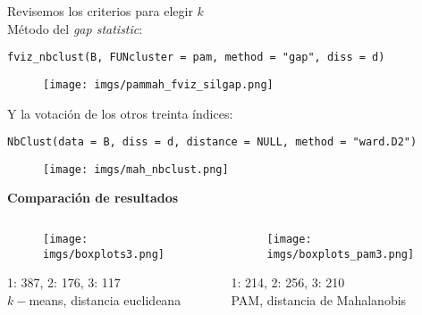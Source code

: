 \documentclass[10pt, aspectratio=169]{beamer}
\begin{document}
{
\begin{frame}[fragile]{}
\vspace{0.3cm}
Revisemos los criterios para elegir $k$\\
\vspace{0.3cm}
\textcolor{UltraViolet}{Método del \textit{gap statistic}:}
\begin{verbatim}
fviz_nbclust(B, FUNcluster = pam, method = "gap", diss = d)
\end{verbatim}
\begin{figure}
 \texttt{[image: imgs/pammah\_fviz\_silgap.png]}
\end{figure}
\end{frame}
}

{
\begin{frame}[fragile]{}
\vspace{0.3cm}
Y la votación de los otros treinta índices:
\begin{verbatim}
NbClust(data = B, diss = d, distance = NULL, method = "ward.D2")
\end{verbatim}
\begin{figure}
 \texttt{[image: imgs/mah\_nbclust.png]}
\end{figure}
\pause
\vspace{-0.2cm}
\end{frame}
}

{
\begin{frame}[fragile]{}
\vspace{0.3cm}
\textcolor{UltraViolet}{\textbf{\large Comparación de resultados}}\\
\vspace{0.3cm}
\begin{columns}
 \begin{center}
  \begin{figure}
  \texttt{[image: imgs/boxplots3.png]}
 \end{figure}
 1: 387, 2: 176, 3: 117\\ 
 $k-$means, distancia euclideana
 \end{center}
 \begin{center}
  \begin{figure}
  \texttt{[image: imgs/boxplots\_pam3.png]}
 \end{figure}
 1: 214, 2: 256, 3: 210\\ 
 PAM, distancia de Mahalanobis
 \end{center}
\end{columns}

\end{frame}
}
\end{document}
